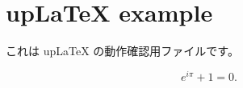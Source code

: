 \documentclass[uplatex,dvipdfmx]{jsarticle}
\begin{document}
\section*{upLaTeX example}

これは upLaTeX の動作確認用ファイルです。

\[
  e^{i\pi} + 1 = 0.
\]
\end{document}
